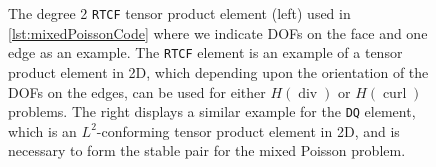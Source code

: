 \documentclass[format=acmsmall,screen,timestamp=false,a4paper]{acmart}
\DeclareMathOperator{\Div}{div}
\DeclareMathOperator{\curl}{curl}
\newcommand{\hcurl}{\ensuremath{{H}(\curl)}\xspace}
\newcommand{\hdiv}{\ensuremath{{H}(\Div)}\xspace}
\begin{document}
\begin{figure}[htbp]
\caption{The degree 2 \texttt{RTCF} tensor product element \cite{raviart1977mixed} (left) used in \cref{lst:mixedPoissonCode} where we indicate DOFs on the face and one edge as an example.  The \texttt{RTCF} element is an example of a tensor product element in 2D, which depending upon the orientation of the DOFs on the edges, can be used for either \hdiv or \hcurl problems.  The right displays a similar example for the \texttt{DQ} element, which is an $L^2$-conforming tensor product element in 2D, and is necessary to form the stable pair for the mixed Poisson problem.\label{fig:RTCF}}
\end{figure}
  
\end{document}
